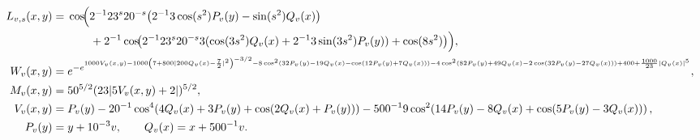\documentclass[10pt]{article}
\begin{document}
\begin{landscape}
\begin{align*}
L_{v,s}(x,y)={}&
\cos\!\Bigl(
2^{-1}23^s20^{-s}\bigl(2^{-1}3\cos(s^2)P_v(y)-\sin(s^2)Q_v(x)\bigr)
\\
&\qquad+2^{-1}\cos\!\bigl(2^{-1}23^s20^{-s}3(\cos(3s^2)Q_v(x)+2^{-1}3\sin(3s^2)P_v(y))+\cos(8s^2)\bigr)
\Bigr),
\\
W_v(x,y)={}&
e^{-e^{1000V_v(x,y)-1000\left(7+800|200Q_v(x)-\frac72|^2\right)^{-3/2}
-8\cos^2(32P_v(y)-19Q_v(x)-\cos(12P_v(y)+7Q_v(x)))
-4\cos^2(82P_v(y)+49Q_v(x)-2\cos(32P_v(y)-27Q_v(x)))
+400+\frac{1000}{23}|Q_v(x)|^{5}}},
\\
M_v(x,y)={}&50^{5/2}(23|5V_v(x,y)+2|)^{5/2},
\\
V_v(x,y)={}&P_v(y)-20^{-1}\cos^4\!\left(4Q_v(x)+3P_v(y)+\cos(2Q_v(x)+P_v(y))\right)
-500^{-1}9\cos^2\!\left(14P_v(y)-8Q_v(x)+\cos(5P_v(y)-3Q_v(x))\right),
\\
P_v(y)={}&y+10^{-3}v,\qquad Q_v(x)=x+500^{-1}v.
\end{align*}


\end{landscape}
\end{document}
